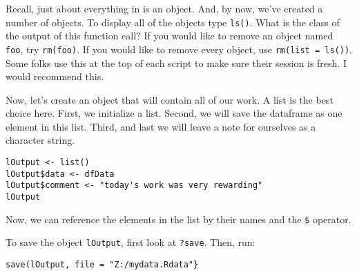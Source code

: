 Recall, just about everything in \R{} is an object. And, by now, we've
created a number of objects. To display all of the objects type
\texttt{ls()}. What is the class of the output of this function call?
If you would like to remove an object named \texttt{foo}, try
\texttt{rm(foo)}. If you would like to remove every object, use
\texttt{rm(list = ls())}. Some folks use this at the top of each
script to make sure their \R{} session is fresh. I would recommend
this.

Now, let's create an object that will contain all of our work. A list
is the best choice here. First, we initialize a list. Second, we will
save the dataframe as one element in this list. Third, and last we
will leave a note for ourselves as a character string.
\begin{verbatim}
lOutput <- list()
lOutput$data <- dfData
lOutput$comment <- "today's work was very rewarding"
lOutput
\end{verbatim}
Now, we can reference the elements in the list by their names and the
\texttt{\$} operator.

To save the object \texttt{lOutput}, first look at
\texttt{?save}. Then, run:
\begin{verbatim}
save(lOutput, file = "Z:/mydata.Rdata"}
\end{verbatim}

